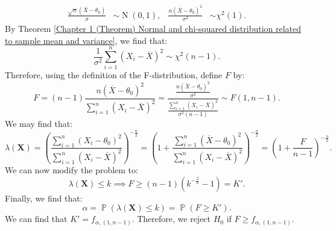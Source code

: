 \documentclass{huhtakm-template-book-v2}
\DeclareMathOperator{\prob}{\mathbb{P}}
\DeclareMathOperator{\N}{N}
\begin{document}
\begin{eg}
        \begin{align*}
            \frac{\sqrt{n}(\overline{X}-\theta_{0})}{\sigma}&\sim\N(0,1), & \frac{n(\overline{X}-\theta_{0})^{2}}{\sigma^{2}}&\sim\chi^{2}(1).
        \end{align*}
        By Theorem \ref{Chapter 1 (Theorem) Normal and chi-squared distribution related to sample mean and variance}, we find that:
        \begin{equation*}
            \frac{1}{\sigma^{2}}\sum_{i=1}^{n}(X_{i}-\overline{X})^{2}\sim\chi^{2}(n-1).
        \end{equation*}
        Therefore, using the definition of the F-distribution, define $F$ by:
        \begin{equation*}
            F=(n-1)\frac{n(\overline{X}-\theta_{0})^{2}}{\sum_{i=1}^{n}(X_{i}-\overline{X})^{2}}=\frac{\frac{n(\overline{X}-\theta_{0})^{2}}{\sigma^{2}}}{\frac{\sum_{i=1}^{n}(X_{i}-\overline{X})^{2}}{\sigma^{2}(n-1)}}\sim F(1,n-1).
        \end{equation*}
        We may find that:
        \begin{equation*}
            \lambda(\mathbf{X})=\left(\frac{\sum_{i=1}^{n}(X_{i}-\theta_{0})^{2}}{\sum_{i=1}^{n}(X_{i}-\overline{X})^{2}}\right)^{-\frac{n}{2}}=\left(1+\frac{\sum_{i=1}^{n}(\overline{X}-\theta_{0})^{2}}{\sum_{i=1}^{n}(X_{i}-\overline{X})^{2}}\right)^{-\frac{n}{2}}=\left(1+\frac{F}{n-1}\right)^{-\frac{n}{2}}.
        \end{equation*}
        We can now modify the problem to:
        \begin{equation*}
            \lambda(\mathbf{X})\leq k\implies F\geq(n-1)\left(k^{-\frac{2}{n}}-1\right)=K'.
        \end{equation*}
        Finally, we find that:
        \begin{equation*}
            \alpha=\prob(\lambda(\mathbf{X})\leq k)=\prob(F\geq K').
        \end{equation*}
        We can find that $K'=f_{\alpha,(1,n-1)}$. Therefore, we reject $H_{0}$ if $F\geq f_{\alpha,(1,n-1)}$.
    \end{eg}
    \newpage
\end{document}
